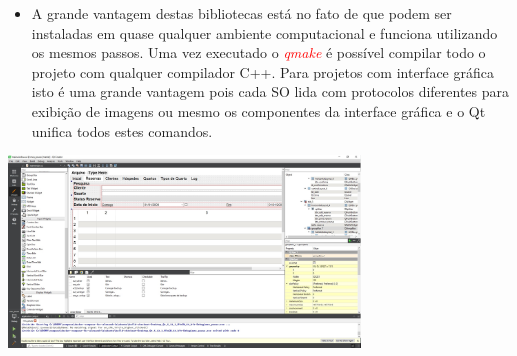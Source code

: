 \documentclass[10pt]{beamer}
\theoremstyle{remark}
\theoremstyle{definition}
\newcommand{\code}[1]{\textcolor{red} {\textit{#1}}} %
\begin{document}
\begin{frame}[allowframebreaks]
\begin{itemize}
		\item A grande vantagem destas bibliotecas está no fato de que podem ser instaladas em quase qualquer ambiente computacional e funciona utilizando os mesmos passos. Uma vez executado o \code{qmake} é possível compilar todo o projeto com qualquer compilador C++. Para projetos com interface gráfica isto é uma grande vantagem pois cada SO lida com protocolos diferentes para exibição de imagens ou mesmo os componentes da interface gráfica e o Qt unifica todos estes comandos.
	\end{itemize}
	
	\framebreak
	
	\begin{center}
		\includegraphics[width=0.7\textwidth]{images/04.jpg}
	\end{center}

\end{frame}
\end{document}
